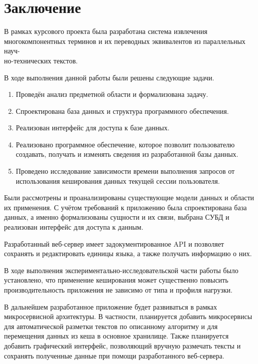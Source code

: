 \section*{Заключение}

В рамках курсового проекта была разработана система извлечения многокомпонентных терминов и их переводных эквивалентов из параллельных науч-\\но-технических текстов.

В ходе выполнения данной работы были решены следующие задачи.

\begin{enumerate}[label*=\arabic*.]
	\item Проведён анализ предметной области и формализована задачу.
	\item Спроектирована база данных и структура программного обеспечения.
	\item Реализован интерфейс для доступа к базе данных. 
	\item Реализовано программное обеспечение, которое позволит пользователю создавать, получать и изменять сведения из разработанной базы данных. 
	\item Проведено исследование зависимости времени выполнения запросов от использования кеширования данных текущей сессии пользователя.
\end{enumerate}


Были рассмотрены и проанализированы существующие модели данных и области их применения. %
С учётом требований к приложению была спроектирована база данных, а именно формализованы сущности и их связи, выбрана СУБД и реализован интерфейс для доступа к данным.

Разработанный веб-сервер имеет задокументированное API и позволяет сохранять и редактировать единицы языка, а также получать информацию о них.

В ходе выполнения экспериментально-исследовательской части работы было установлено, что применение кеширования может существенно повысить производительность приложения не зависимо от типа и профиля нагрузки.


В дальнейшем разработанное приложение будет развиваться в рамках микросервисной архитектуры. В частности, планируется добавить микросервисы для автоматической разметки текстов по описанному алгоритму и для перемещения данных из кеша в основное хранилище. Также планируется добавить графический интерфейс, позволяющий вручную размечать тексты и сохранять полученные данные при помощи разработанного веб-сервера.

